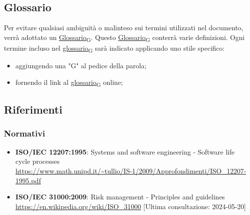 \subsection{Glossario}
Per evitare qualsiasi ambiguità o malinteso sui termini utilizzati nel documento, verrà adottato un \href{https://7last.github.io/docs/rtb/documentazione-interna/glossario#glossario}{Glossario\textsubscript{G}}. Questo \href{https://7last.github.io/docs/rtb/documentazione-interna/glossario#glossario}{Glossario\textsubscript{G}} conterrà varie definizioni. Ogni termine incluso nel \href{https://7last.github.io/docs/rtb/documentazione-interna/glossario#glossario}{glossario\textsubscript{G}} sarà indicato applicando uno stile specifico:
\begin{itemize}
	\item aggiungendo una "G" al pedice della parola;
	\item fornendo il link al \href{https://7last.github.io/docs/rtb/documentazione-interna/glossario\#glossario}{glossario\textsubscript{G}} online;
\end{itemize}

\subsection{Riferimenti}
\subsubsection{Normativi} 
\begin{itemize}
	\item \textbf{ISO/IEC 12207:1995}: Systems and software engineering - Software life cycle processes \\\url{https://www.math.unipd.it/~tullio/IS-1/2009/Approfondimenti/ISO_12207-1995.pdf}
	\item \textbf{ISO/IEC 31000:2009}: Risk management - Principles and guidelines \\\url{https://en.wikipedia.org/wiki/ISO_31000} [Ultima consultazione: 2024-05-20]
\end{itemize}

